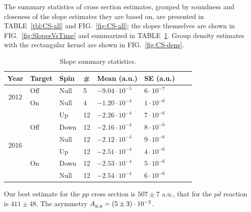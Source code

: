 \documentclass[reprint]{revtex4-1}
\begin{document}
The summary statistics of cross section estimates, grouped by soundness and closeness of the slope estimates they are based on, are presented in TABLE~\ref{tbl:CS-all} and FIG.~\ref{fig:CS-all}; the slopes themselves are shown in FIG.~\ref{fig:SlopesVsTime} and summarized in TABLE~\ref{tbl:Slp-big}. Group density estimates with the rectangular kernel are shown in FIG.~\ref{fig:CS-dens}.

\newcommand{\vp}[2]{#1\cdot10^{#2}}
\begin{table}
\centering
\caption{Slope summary statistics. \label{tbl:Slp-big}}
\begin{tabular}{c|lllllrr}
	\hline\hline
	        Year          & Target               & Spin & \# & Mean (a.u.)      & SE (a.u.)    \\ \hline
	\multirow{2}{*}{2012} & Off                  & Null & 5  & $\vp{-9.04}{-5}$ & $\vp{6}{-7}$ \\
	                      & On                   & Null & 4  & $\vp{-1.20}{-4}$ & $\vp{1}{-6}$ \\ \hline
	\multirow{6}{*}{2016} & \multirow{3}{*}{Off} & Up   & 12 & $\vp{-2.26}{-4}$ & $\vp{7}{-6}$ \\
	                      &                      & Down & 12 & $\vp{-2.16}{-4}$ & $\vp{8}{-6}$ \\
	                      &                      & Null & 12 & $\vp{-2.12}{-4}$ & $\vp{9}{-6}$ \\
	                      & \multirow{3}{*}{On}  & Up   & 12 & $\vp{-2.51}{-4}$ & $\vp{4}{-6}$ \\
	                      &                      & Down & 12 & $\vp{-2.53}{-4}$ & $\vp{5}{-6}$ \\
	                      &                      & Null & 12 & $\vp{-2.54}{-4}$ & $\vp{6}{-6}$ 
\end{tabular}
\end{table}

Our best estimate for the $pp$ cross section is $507 \pm 7$ a.u., that for the $pd$ reaction is $411 \pm 48$. The asymmetry $\Ayy = \vp{(5 \pm 3)}{-2}$. %

\end{document}
